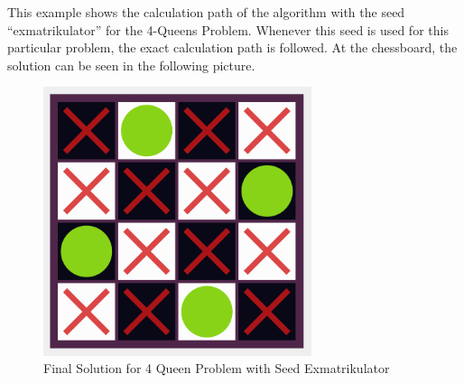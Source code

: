 This example shows the calculation path of the algorithm with the seed \enquote{exmatrikulator} for the 4-Queens Problem. Whenever this seed is used for this particular problem, the exact calculation path is followed. At the chessboard, the solution can be seen in the following picture.
\begin{figure}[H]
  \centering
  \includegraphics[width=0.7\textwidth]{img/Proof_Chessboard}
  \caption{Final Solution for 4 Queen Problem with Seed Exmatrikulator}
  \label{fig:design}
\end{figure} 
